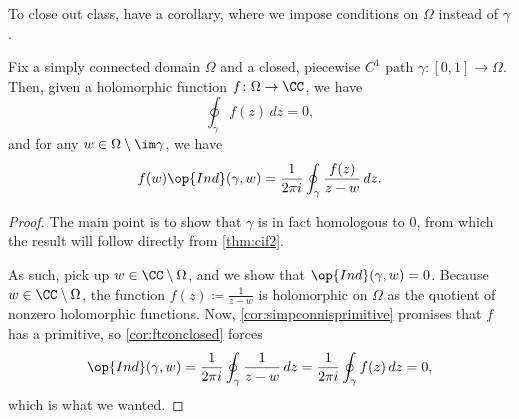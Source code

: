 To close out class, have a corollary, where we impose conditions on $\Omega$ instead of $\gamma$.
\begin{corollary} \label{cor:cifhomotopy}
	Fix a simply connected domain $\Omega$ and a closed, piecewise $C^1$ path $\gamma\colon [0,1]\to\Omega$. Then, given a holomorphic function $f\colon \Omega\to\CC$, we have
	\[\oint_\gamma f(z)\,dz=0,\]
	and for any $w\in\Omega\setminus\im\gamma$, we have
	\[f(w)\op{Ind}(\gamma,w)=\frac1{2\pi i}\oint_\gamma\frac{f(z)}{z-w}\,dz.\]
\end{corollary}
\begin{proof}
	The main point is to show that $\gamma$ is in fact homologous to $0$, from which the result will follow directly from \autoref{thm:cif2}.

	As such, pick up $w\in\CC\setminus\Omega$, and we show that $\op{Ind}(\gamma,w)=0$. Because $w\in\CC\setminus\Omega$, the function $f(z)\coloneqq \frac1{z-w}$ is holomorphic on $\Omega$ as the quotient of nonzero holomorphic functions. Now, \autoref{cor:simpconnisprimitive} promises that $f$ has a primitive, so \autoref{cor:ftconclosed} forces
	\[\op{Ind}(\gamma,w)=\frac1{2\pi i}\oint_\gamma\frac1{z-w}\,dz=\frac1{2\pi i}\oint_\gamma f(z)\,dz=0,\]
	which is what we wanted.
\end{proof}